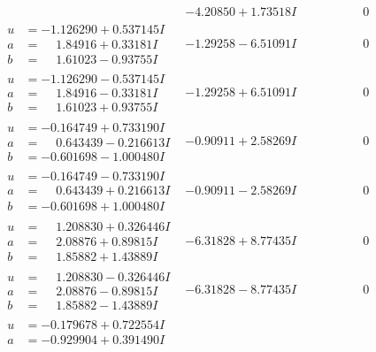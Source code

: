 \documentclass[1p]{elsarticle_modified}
\theoremstyle{definition}
\begin{document}
$$\begin{array}{c|c|c}
 & -4.20850 + 1.73518 I & \phantom{-0.000000 } 0 \\ \hline\begin{aligned}
u &= -1.126290 + 0.537145 I \\
a &= \phantom{-}1.84916 + 0.33181 I \\
b &= \phantom{-}1.61023 - 0.93755 I\end{aligned}
 & -1.29258 - 6.51091 I & \phantom{-0.000000 } 0 \\ \hline\begin{aligned}
u &= -1.126290 - 0.537145 I \\
a &= \phantom{-}1.84916 - 0.33181 I \\
b &= \phantom{-}1.61023 + 0.93755 I\end{aligned}
 & -1.29258 + 6.51091 I & \phantom{-0.000000 } 0 \\ \hline\begin{aligned}
u &= -0.164749 + 0.733190 I \\
a &= \phantom{-}0.643439 - 0.216613 I \\
b &= -0.601698 - 1.000480 I\end{aligned}
 & -0.90911 + 2.58269 I & \phantom{-0.000000 } 0 \\ \hline\begin{aligned}
u &= -0.164749 - 0.733190 I \\
a &= \phantom{-}0.643439 + 0.216613 I \\
b &= -0.601698 + 1.000480 I\end{aligned}
 & -0.90911 - 2.58269 I & \phantom{-0.000000 } 0 \\ \hline\begin{aligned}
u &= \phantom{-}1.208830 + 0.326446 I \\
a &= \phantom{-}2.08876 + 0.89815 I \\
b &= \phantom{-}1.85882 + 1.43889 I\end{aligned}
 & -6.31828 + 8.77435 I & \phantom{-0.000000 } 0 \\ \hline\begin{aligned}
u &= \phantom{-}1.208830 - 0.326446 I \\
a &= \phantom{-}2.08876 - 0.89815 I \\
b &= \phantom{-}1.85882 - 1.43889 I\end{aligned}
 & -6.31828 - 8.77435 I & \phantom{-0.000000 } 0 \\ \hline\begin{aligned}
u &= -0.179678 + 0.722554 I \\
a &= -0.929904 + 0.391490 I \\

\end{aligned}
\end{array}$$
\end{document}
